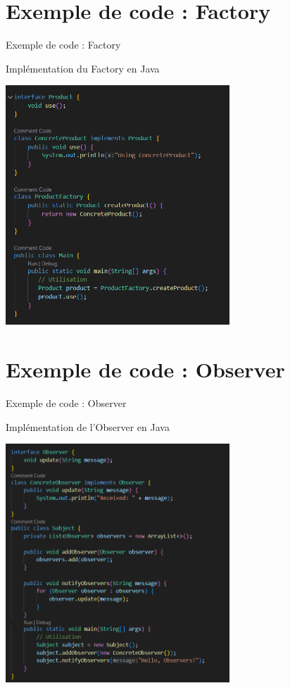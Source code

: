 \documentclass{clbeamer2024}
\begin{document}
	\section{Exemple de code : Factory}
	\begin{frame}{Exemple de code : Factory}
		\begin{exampleblock}{Implémentation du Factory en Java}
			\begin{center}
				\includegraphics[width=0.63\textwidth]{images/code2.png}
			\end{center}
		\end{exampleblock}
	\end{frame}
	
	
	
	\section{Exemple de code : Observer}
	\begin{frame}{Exemple de code : Observer}
		\begin{exampleblock}{Implémentation de l'Observer en Java}
			
			\begin{center}
				\includegraphics[width=0.63\textwidth]{images/code3.png}
			\end{center}
		
		\end{exampleblock}
	\end{frame}
	
\end{document}
